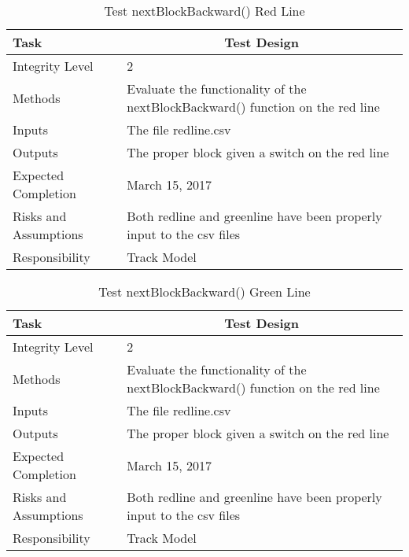 \documentclass[]{article}
\begin{document}
\begin{table}[H]
	\centering
	\caption{Test nextBlockBackward() Red Line}
	\begin{tabular}{|l|l|}
		\hline
		Task & \multicolumn{1}{c|}{Test Design} \\ \hline
		Integrity Level & 2 \\ \hline
		Methods & \parbox[t]{10cm}{Evaluate the functionality of the nextBlockBackward() function on the red line} \\ \hline
		Inputs &  The file redline.csv \\ \hline
		Outputs &  The proper block given a switch on the red line\\ \hline
		Expected Completion & March 15, 2017\\ \hline
		Risks and Assumptions & Both redline and greenline have been properly input to the csv files \\ \hline
		Responsibility & Track Model\\ \hline
	\end{tabular}
\end{table}

\begin{table}[H]
	\centering
	\caption{Test nextBlockBackward() Green Line}
	\begin{tabular}{|l|l|}
		\hline
		Task & \multicolumn{1}{c|}{Test Design} \\ \hline
		Integrity Level & 2 \\ \hline
		Methods & \parbox[t]{10cm}{Evaluate the functionality of the nextBlockBackward() function on the red line} \\ \hline
		Inputs &  The file redline.csv \\ \hline
		Outputs &  The proper block given a switch on the red line\\ \hline
		Expected Completion & March 15, 2017\\ \hline
		Risks and Assumptions & Both redline and greenline have been properly input to the csv files \\ \hline
		Responsibility & Track Model\\ \hline
	\end{tabular}
\end{table}
\end{document}
